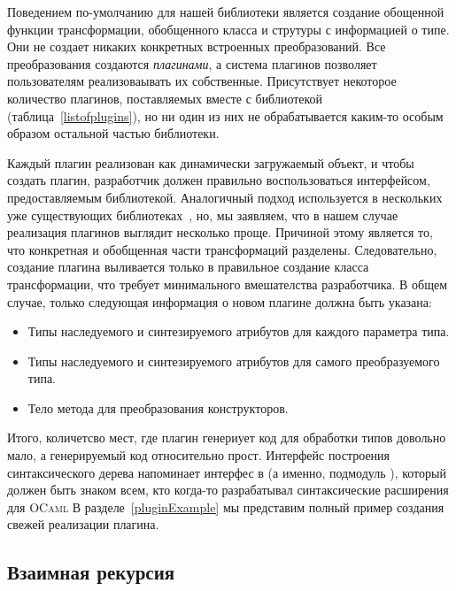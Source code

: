 Поведением по-умолчанию для нашей библиотеки является создание обощенной функции трансформации, обобщенного класса и струтуры с информацией о типе. Они не создает никаких конкретных встроенных преобразований. Все преобразования создаются \emph{плагинами}, а система плагинов позволяет пользователям реализоваывать их собственные.
Присутствует некоторое количество плагинов, поставляемых вместе с библиотекой 
(таблица~\ref{listofplugins}), но ни один из них не обрабатывается каким-то особым образом остальной частью библиотеки.

Каждый плагин реализован как динамически загружаемый объект, и чтобы создать плагин, разработчик должен правильно воспользоваться интерфейсом, предоставляемым библиотекой.
Аналогичный подход используется в нескольких уже существующих 
библиотеках~\cite{PPXLib,Yallop}, но, мы заявляем, что в нашем случае реализация плагинов выглядит несколько проще. Причиной этому является то, что конкретная и обобщенная части трансформаций разделены. Следовательно, создание плагина выливается только в правильное создание класса трансформации, что требует минимального вмешателства разработчика.
В общем случае, только следующая информация о новом плагине должна быть указана:

\begin{itemize}
\item Типы наследуемого и синтезируемого атрибутов для каждого параметра типа.
\item Типы наследуемого и синтезируемого атрибутов для самого преобразуемого типа.
\item Тело метода для преобразования конструкторов.
\end{itemize}

Итого, количетсво мест, где плагин генериует код для обработки типов довольно мало, а генерируемый код относительно прост. Интерфейс построения синтаксического дерева напоминает интерфес в  (а именно, подмодуль ), который должен быть знаком всем, кто когда-то разрабатывал синтаксические расширения для \textsc{OCaml}
В разделе~\ref{pluginExample} мы представим полный пример создания свежей реализации плагина.

\subsection{Взаимная рекурсия}
\label{murec}

